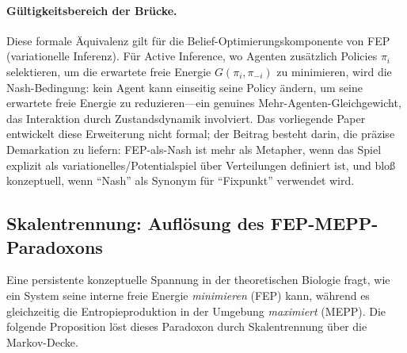 \documentclass[12pt,a4paper]{article}
\theoremstyle{remark}
\begin{document}
\paragraph{G\"ultigkeitsbereich der Br\"ucke.} Diese formale \"Aquivalenz gilt f\"ur die Belief-Optimierungskomponente von FEP (variationelle Inferenz). F\"ur Active Inference, wo Agenten zus\"atzlich Policies $\pi_i$ selektieren, um die erwartete freie Energie $G(\pi_i, \pi_{-i})$ zu minimieren, wird die Nash-Bedingung: kein Agent kann einseitig seine Policy \"andern, um seine erwartete freie Energie zu reduzieren---ein genuines Mehr-Agenten-Gleichgewicht, das Interaktion durch Zustandsdynamik involviert. Das vorliegende Paper entwickelt diese Erweiterung nicht formal; der Beitrag besteht darin, die pr\"azise Demarkation zu liefern: FEP-als-Nash ist mehr als Metapher, wenn das Spiel explizit als variationelles/Potentialspiel \"uber Verteilungen definiert ist, und blo\ss{} konzeptuell, wenn ``Nash'' als Synonym f\"ur ``Fixpunkt'' verwendet wird.

\subsection{Skalentrennung: Aufl\"osung des FEP-MEPP-Paradoxons}
\label{sec:fep-mepp-paradox}

Eine persistente konzeptuelle Spannung in der theoretischen Biologie fragt, wie ein System seine interne freie Energie \emph{minimieren} (FEP) kann, w\"ahrend es gleichzeitig die Entropieproduktion in der Umgebung \emph{maximiert} (MEPP). Die folgende Proposition l\"ost dieses Paradoxon durch Skalentrennung \"uber die Markov-Decke.
\end{document}

